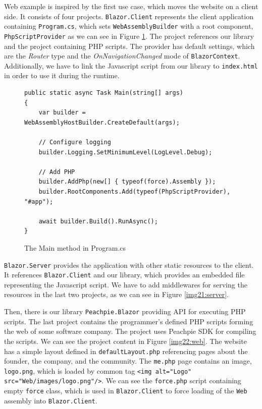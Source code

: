 Web example is inspired by the first use case, which moves the website on a client side.
It consists of four projects. \texttt{Blazor.Client} represents the client application containing \texttt{Program.cs}, which sets \texttt{WebAssemblyBuilder} with a root component, \texttt{PhpScriptProvider} as we can see in Figure \ref{img20:program}.
The project references our library and the project containing PHP scripts.
The provider has default settings, which are the \textit{Router} type and the \textit{OnNavigationChanged} mode of \texttt{BlazorContext}.
Additionally, we have to link the Javascript script from our library to \texttt{index.html} in order to use it during the runtime.
\begin{figure}[H]
\begin{lstlisting}
public static async Task Main(string[] args)
{
	var builder = WebAssemblyHostBuilder.CreateDefault(args);

	// Configure logging
	builder.Logging.SetMinimumLevel(LogLevel.Debug);

	// Add PHP
	builder.AddPhp(new[] { typeof(force).Assembly });
	builder.RootComponents.Add(typeof(PhpScriptProvider), "#app");
            
	await builder.Build().RunAsync();
}
\end{lstlisting}
\caption{The Main method in Program.cs}
\label{img20:program}
\end{figure}
\par
\texttt{Blazor.Server} provides the application with other static resources to the client.
It references \texttt{Blazor.Client} and our library, which provides an embedded file representing the Javascript script.
We have to add middlewares for serving the resources in the last two projects, as we can see in Figure \ref{img21:server}.
\par
Then, there is our library \texttt{Peachpie.Blazor} providing API for executing PHP scripts.
The last project contains the programmer's defined PHP scripts forming the web of some software company.
The project uses Peachpie \ac{SDK} for compiling the scripts.
We can see the project content in Figure \ref{img22:web}.
The website has a simple layout defined in \texttt{defaultLayout.php} referencing pages about the founder, the company, and the community.
The \texttt{me.php} page contains an image, \texttt{logo.png}, which is loaded by common tag \texttt{<img alt="Logo" src="Web/images/logo.png"/>}.
We can see the \texttt{force.php} script containing empty \texttt{force} class, which is used in \texttt{Blazor.Client} to force loading of the \texttt{Web} assembly into \texttt{Blazor.Client}.
